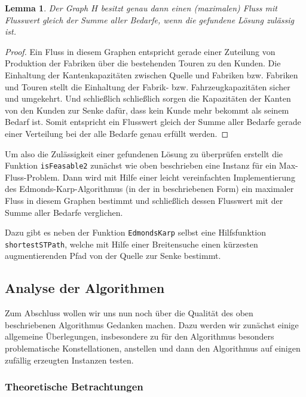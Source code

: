 \documentclass[a4paper,ngerman,11pt,bibtotoc]{scrartcl}
\theoremstyle{definition}
\theoremstyle{plain}
\newtheorem{lemma}[defn]{Lemma}
\theoremstyle{remark}
\begin{document}
	\begin{lemma}
		Der Graph $H$ besitzt genau dann einen (maximalen) Fluss mit Flusswert gleich der Summe aller Bedarfe, wenn die gefundene Lösung zulässig ist.
	\end{lemma}

	\begin{proof}
		Ein Fluss in diesem Graphen entspricht gerade einer Zuteilung von Produktion der Fabriken über die bestehenden Touren zu den Kunden. Die Einhaltung der Kantenkapazitäten zwischen Quelle und Fabriken bzw. Fabriken und Touren stellt die Einhaltung der Fabrik- bzw. Fahrzeugkapazitäten sicher und umgekehrt. Und schließlich schließlich sorgen die Kapazitäten der Kanten von den Kunden zur Senke dafür, dass kein Kunde mehr bekommt als seinem Bedarf ist. Somit entspricht ein Flusswert gleich der Summe aller Bedarfe gerade einer Verteilung bei der alle Bedarfe genau erfüllt werden.
	\end{proof}

	Um also die Zulässigkeit einer gefundenen Lösung zu überprüfen erstellt die Funktion \lstinline|isFeasable2| zunächst wie oben beschrieben eine Instanz für ein Max-Fluss-Problem. Dann wird mit Hilfe einer leicht vereinfachten Implementierung des Edmonds-Karp-Algorithmus (in der in \cite{EdmondsKarp} beschriebenen Form) ein maximaler Fluss in diesem Graphen bestimmt und schließlich dessen Flusswert mit der Summe aller Bedarfe verglichen. 
	
	Dazu gibt es neben der Funktion \lstinline|EdmondsKarp| selbst eine Hilfsfunktion \lstinline|shortestSTPath|, welche mit Hilfe einer Breitensuche einen kürzesten augmentierenden Pfad von der Quelle zur Senke bestimmt.
	   	

	\subsection{Analyse der Algorithmen}\label{sec:Analyse}
	
	Zum Abschluss wollen wir uns nun noch über die Qualität des oben beschriebenen Algorithmus Gedanken machen. Dazu werden wir zunächst einige allgemeine Überlegungen, insbesondere zu für den Algorithmus besonders problematische Konstellationen, anstellen und dann den Algorithmus auf einigen zufällig erzeugten Instanzen testen.
	
	\subsubsection{Theoretische Betrachtungen}\label{sec:Analyse:theoretisch}
	
\end{document}
